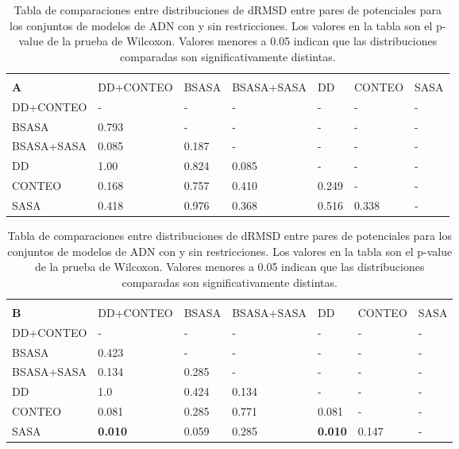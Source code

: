 \begin{table}[!htp]
\begin{tabular}{p{78pt} p{78pt} p{40pt} p{70pt} p{25pt} p{39pt} p{20pt}}
\hline \\
\textbf{A}   & DD+CONTEO   & BSASA    & BSASA+SASA & DD       & CONTEO   & SASA \\
DD+CONTEO    & -           & -        & -          & -        & -        & -    \\
BSASA        & 0.793       & -        & -          & -        & -        & -    \\
BSASA+SASA   & 0.085       & 0.187    & -          & -        & -        & -    \\
DD           & 1.00        & 0.824    & 0.085      & -        & -        & -    \\
CONTEO       & 0.168       & 0.757    & 0.410      & 0.249    & -        & -    \\
SASA         & 0.418       & 0.976    & 0.368      & 0.516    & 0.338    & -    \\
\hline
\end{tabular}
\begin{tabular}{p{78pt} p{78pt} p{40pt} p{70pt} p{25pt} p{39pt} p{20pt}}
\hline \\
\textbf{B} & DD+CONTEO  & BSASA & BSASA+SASA & DD       & CONTEO   & SASA \\
DD+CONTEO    & -        & -     & -          & -        & -        & -    \\
BSASA        & 0.423    & -     & -          & -        & -        & -    \\
BSASA+SASA   & 0.134    & 0.285 & -          & -        & -        & -    \\
DD           & 1.0      & 0.424 & 0.134      & -        & -        & -    \\
CONTEO       & 0.081    & 0.285 & 0.771      & 0.081    & -        & -    \\
SASA         & \textbf{0.010}    & 0.059 & 0.285      & \textbf{0.010}    & 0.147    & -    \\
\hline
\end{tabular}
\caption[Tabla de comparaciones entre distribuciones de dRMSD entre pares de potenciales para los conjuntos de modelos de ADN con y sin restricciones.]{Tabla de comparaciones entre distribuciones de dRMSD entre pares de potenciales para los conjuntos de modelos de ADN con y sin restricciones. Los valores en la tabla son el p-value de la prueba de Wilcoxon. Valores menores a 0.05 indican que las distribuciones comparadas son significativamente distintas.}
\label{table:dnacomp}
\end{table}

